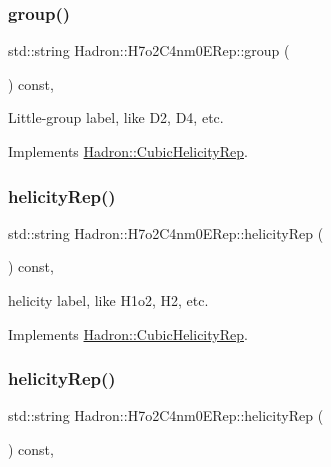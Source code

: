 \subsubsection{\texorpdfstring{group()}{group()}\hspace{0.1cm}{\footnotesize\ttfamily [2/2]}}
{\footnotesize\ttfamily std\+::string Hadron\+::\+H7o2\+C4nm0\+E\+Rep\+::group (\begin{DoxyParamCaption}{ }\end{DoxyParamCaption}) const\hspace{0.3cm}{\ttfamily [inline]}, {\ttfamily [virtual]}}

Little-\/group label, like D2, D4, etc. 

Implements \mbox{\hyperlink{structHadron_1_1CubicHelicityRep_a101a7d76cd8ccdad0f272db44b766113}{Hadron\+::\+Cubic\+Helicity\+Rep}}.

\mbox{\label{structHadron_1_1H7o2C4nm0ERep_a8b56e7be3339c9a175a52017de66b6d7}} 
\subsubsection{\texorpdfstring{helicityRep()}{helicityRep()}\hspace{0.1cm}{\footnotesize\ttfamily [1/2]}}
{\footnotesize\ttfamily std\+::string Hadron\+::\+H7o2\+C4nm0\+E\+Rep\+::helicity\+Rep (\begin{DoxyParamCaption}{ }\end{DoxyParamCaption}) const\hspace{0.3cm}{\ttfamily [inline]}, {\ttfamily [virtual]}}

helicity label, like H1o2, H2, etc. 

Implements \mbox{\hyperlink{structHadron_1_1CubicHelicityRep_af1096946b7470edf0a55451cc662f231}{Hadron\+::\+Cubic\+Helicity\+Rep}}.

\mbox{\label{structHadron_1_1H7o2C4nm0ERep_a8b56e7be3339c9a175a52017de66b6d7}} 
\subsubsection{\texorpdfstring{helicityRep()}{helicityRep()}\hspace{0.1cm}{\footnotesize\ttfamily [2/2]}}
{\footnotesize\ttfamily std\+::string Hadron\+::\+H7o2\+C4nm0\+E\+Rep\+::helicity\+Rep (\begin{DoxyParamCaption}{ }\end{DoxyParamCaption}) const\hspace{0.3cm}{\ttfamily [inline]}, {\ttfamily [virtual]}}

